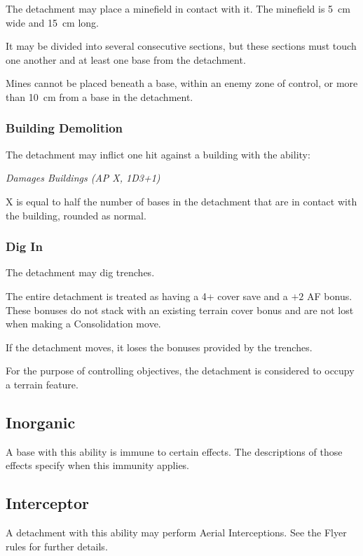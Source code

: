 The detachment may place a minefield in contact with it. The minefield is 5~cm wide and 15~cm long.

It may be divided into several consecutive sections, but these sections must touch one another and at least one base from the detachment.

Mines cannot be placed beneath a base, within an enemy zone of control, or more than 10~cm from a base in the detachment.

\subsubsection{Building Demolition}

The detachment may inflict one hit against a building with the ability:

\begin{center}
    \textit{Damages Buildings (AP X, 1D3+1)}
\end{center}

X is equal to half the number of bases in the detachment that are in contact with the building, rounded as normal.

\subsubsection{Dig In}

The detachment may dig trenches.

The entire detachment is treated as having a 4+ cover save and a $+2$ AF bonus. These bonuses do not stack with an existing terrain cover bonus and are not lost when making a Consolidation move.

If the detachment moves, it loses the bonuses provided by the trenches.

For the purpose of controlling objectives, the detachment is considered to occupy a terrain feature.

\subsection{Inorganic}

A base with this ability is immune to certain effects. The descriptions of those effects specify when this immunity applies.

\subsection{Interceptor}

A detachment with this ability may perform Aerial Interceptions. See the Flyer rules for further details.

